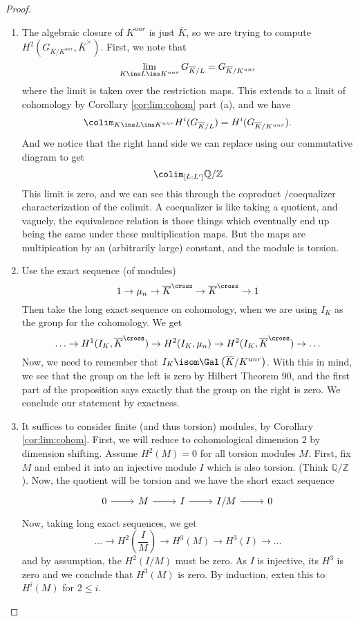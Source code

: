 \begin{proof}
	\begin{enumerate}[(1)]
		\item The algebraic closure of \(K^{unr}\) is just \(\overline{K}\),
			so we are trying to compute 
			\(H^{2}(G_{\overline{K} / K^{unr}},\overline{K}^{\times})\).
			First, we note that
			 \[
			 \lim_{K \ins L \ins K^{unr}} G_{\overline{K} / L} 
			 = G_{\overline{K} / K^{unr}}
			 \] 
			where the limit is taken over the restriction maps.
			This extends to a limit of cohomology by 
			Corollary \ref{cor:lim:cohom} part (a), and
			we have
			\[
				\colim_{K \ins L \ins K^{unr}} H^{i}(G_{\overline{K} / L}) 
				= H^{i}(G_{\overline{K} / K^{unr}})
			.\] 
			And we notice that the right hand side we can replace using
			our commutative diagram to get
			\[
				\colim_{[L:L^{\prime}]} \mathbb{Q} / \mathbb{Z}
			\] 
			This limit is zero, and we can see this through the coproduct
			/coequalizer characterization of the colimit. 
			A coequalizer is like taking a quotient, and vaguely, the 
			equivalence relation is those things which eventually end up being
			the same under these multiplication maps. 
			But the maps are multipication by an (arbitrarily large) constant,
			and the module is torsion.
		\item Use the exact sequence (of modules) 
			\[
			1 \to \mu_{n} \to \overline{K}^{\cross} \to \overline{K}^{\cross}
			\to 1
			\] 
			Then take the long exact sequence on cohomology, when we are using
			\(I_{K}\) as the group for the cohomology.
			We get 
			\[
				\ldots \to H^{1}(I_{K},\overline{K}^{\cross}) \to
				H^{2}(I_{K}, \mu_{n}) \to H^{2}(I_{K},\overline{K}^{\cross})
				\to \ldots
			\] 
			Now, we need to remember that 
            \(I_{K} \isom \Gal\left( \overline{K} / K^{unr} \right)\).
			With this in mind, we see that
			the group on the left is zero by Hilbert Theorem 90, and
			the first part of the proposition
			says exactly that the group on the right is zero. 
			We conclude our statement by exactness.
			
		\item 
			It suffices to consider
			finite (and thus torsion) modules, by Corollary \ref{cor:lim:cohom}.
			First, we will reduce to cohomological dimension 2 by dimension
			shifting. 
			Assume \(H^{2}(M) = 0\) for all torsion modules \(M\).
			First, fix \(M\) and embed it into an injective module \(I\) 
			which is also torsion.
			(Think \(\mathbb{Q} / \mathbb{Z}\)).
			Now, the quotient will be torsion and we have the short exact sequence
			\[
			\begin{tikzcd}
			0 \arrow{r}{} & M \arrow{r}{} & 
			I \arrow{r}{} & I / M \arrow{r}{} & 0
			\end{tikzcd}
			\]
			Now, taking long exact sequences, we get
			\[
				\ldots \to H^{2}(\frac{I}{M}) \to 
				H^{3}(M) \to H^{3}(I) \to \ldots
			\] 
			and by assumption, the \(H^{2}(I / M)\) must be zero.
			As \(I\) is injective, its \(H^{3}\) is zero and we conclude
			that \(H^{3}(M)\) is zero. 
			By induction, exten this to \(H^{i}(M)\) for \(2 \leq i\).


\end{enumerate}
\end{proof}
